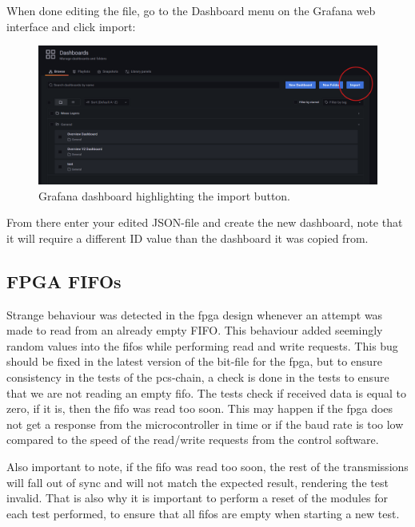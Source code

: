 \documentclass[main.tex]{subfiles}
\begin{document}
When done editing the file, go to the Dashboard menu on the Grafana web interface and click import:

\begin{figure}[!ht]
    \centering
    \includegraphics[scale=0.4]{images/grafana_import.png}
    \caption{Grafana dashboard highlighting the import button.}
    \label{fig: grafana_import}
\end{figure}
\FloatBarrier 

From there enter your edited JSON-file and create the new dashboard, note that it will require a different ID value than the dashboard it was copied from.


\subsection{FPGA FIFOs}

Strange behaviour was detected in the \gls{fpga} design whenever an attempt was made to read from an already empty FIFO. This behaviour added seemingly random values into the \gls{fifo}s while performing read and write requests. This bug should be fixed in the latest version of the bit-file for the \gls{fpga}, but to ensure consistency in the tests of the \gls{pcs}-chain, a check is done in the tests to ensure that we are not reading an empty \gls{fifo}. The tests check if received data is equal to zero, if it is, then the \gls{fifo} was read too soon. This may happen if the \gls{fpga} does not get a response from the microcontroller in time or if the baud rate is too low compared to the speed of the read/write requests from the control software.

Also important to note, if the \gls{fifo} was read too soon, the rest of the transmissions will fall out of sync and will not match the expected result, rendering the test invalid. That is also why it is important to perform a reset of the modules for each test performed, to ensure that all \gls{fifo}s are empty when starting a new test.
\end{document}
